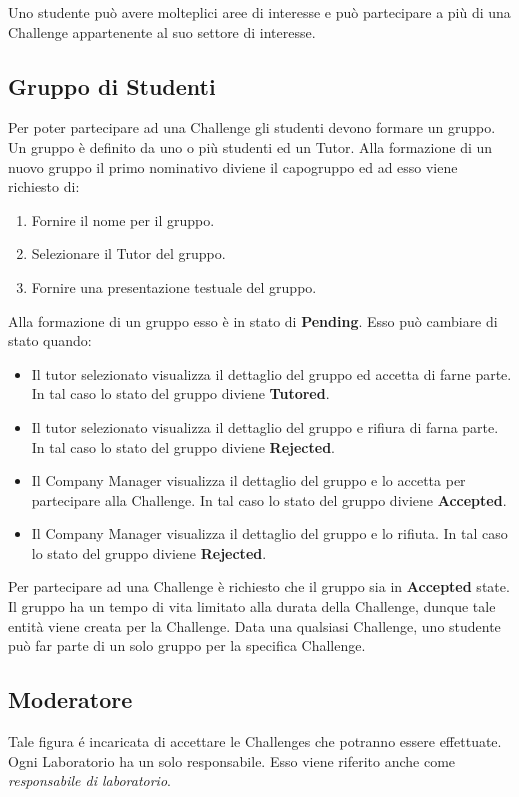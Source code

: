 Uno studente può avere molteplici aree di interesse e può partecipare a più di una Challenge appartenente al suo settore di interesse.

\subsection{Gruppo di Studenti}
Per poter partecipare ad una Challenge gli studenti devono formare un gruppo. Un gruppo è definito da uno o più studenti ed un Tutor. 
Alla formazione di un nuovo gruppo il primo nominativo diviene il capogruppo ed ad esso viene richiesto di:
 \begin{enumerate}
        \item Fornire il nome per il gruppo.
        \item Selezionare il Tutor del gruppo. 
        \item Fornire una presentazione testuale del gruppo. 
\end{enumerate}

Alla formazione di un gruppo esso è in stato di \textbf{Pending}. Esso può cambiare di stato quando:
\begin{itemize}
    \item Il tutor selezionato visualizza il dettaglio del gruppo ed accetta di farne parte. In tal caso lo stato del gruppo diviene \textbf{Tutored}. 
    \item Il tutor selezionato visualizza il dettaglio del gruppo e rifiura di farna parte. In tal caso lo stato del gruppo diviene \textbf{Rejected}. 
    \item Il Company Manager visualizza il dettaglio del gruppo e lo accetta per partecipare alla Challenge. In tal caso lo stato del gruppo diviene \textbf{Accepted}. 
    \item Il Company Manager visualizza il dettaglio del gruppo e lo rifiuta. In tal caso lo stato del gruppo diviene \textbf{Rejected}. 
\end{itemize}

Per partecipare ad una Challenge è richiesto che il gruppo sia in \textbf{Accepted} state. Il gruppo ha un tempo di vita limitato alla durata della Challenge, dunque tale entità viene creata per la Challenge. Data una qualsiasi Challenge, uno studente può far parte di un solo gruppo per la specifica Challenge.



\subsection{Moderatore}
\label{sec:moderatore}
Tale figura é incaricata di accettare le Challenges che potranno essere effettuate. Ogni Laboratorio ha un solo responsabile. Esso viene riferito anche come \textit{responsabile di laboratorio}.

